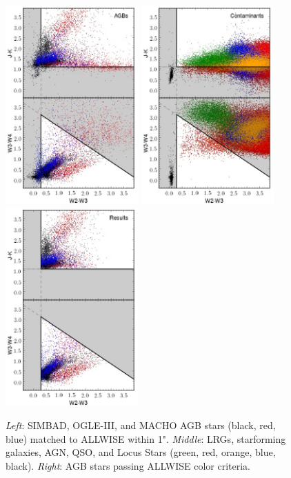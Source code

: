 \begin{figure}
\centering
\includegraphics[width=2in]{figs/sampleboundaries.jpg}
\includegraphics[width=2in]{figs/contamboundaries.jpg}
\includegraphics[width=2in]{figs/sample_results.jpg}
\caption{{\footnotesize\emph{Left}: SIMBAD, OGLE-III, and MACHO AGB stars (black, red, blue) matched to ALLWISE within 1". \emph{Middle}: LRGs, starforming galaxies, AGN, QSO, and Locus Stars (green, red, orange, blue, black). \emph{Right}: AGB stars passing ALLWISE color criteria.}}
\label{fig:boundaries}
\end{figure}

